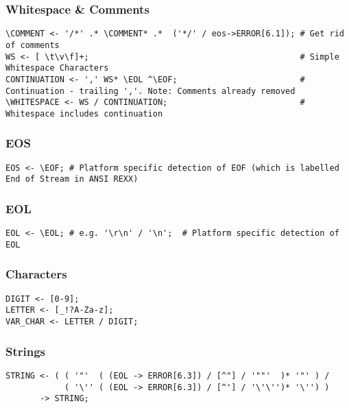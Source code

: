\subsubsection{Whitespace \& Comments}

\begin{verbatim}
\COMMENT <- '/*' .* \COMMENT* .*  ('*/' / eos->ERROR[6.1]); # Get rid of comments
WS <- [ \t\v\f]+;                                           # Simple Whitespace Characters
CONTINUATION <- ',' WS* \EOL ^\EOF;                         # Continuation - trailing ','. Note: Comments already removed
\WHITESPACE <- WS / CONTINUATION;                           # Whitespace includes continuation
\end{verbatim}

\subsubsection{EOS}

\begin{verbatim}
EOS <- \EOF; # Platform specific detection of EOF (which is labelled End of Stream in ANSI REXX)
\end{verbatim}

\subsubsection{EOL}

\begin{verbatim}
EOL <- \EOL; # e.g. '\r\n' / '\n';  # Platform specific detection of EOL
\end{verbatim}

\subsubsection{Characters}

\begin{verbatim}
DIGIT <- [0-9];
LETTER <- [_!?A-Za-z];
VAR_CHAR <- LETTER / DIGIT;
\end{verbatim}

\subsubsection{Strings}

\begin{verbatim}
STRING <- ( ( '"'  ( (EOL -> ERROR[6.3]) / [^"] / '""'  )* '"' ) /
            ( '\'' ( (EOL -> ERROR[6.3]) / [^'] / '\'\'')* '\'') )
       -> STRING; 
\end{verbatim}

